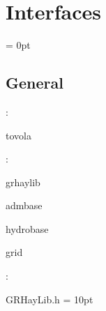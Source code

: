 
\section{Interfaces} 


\parskip = 0pt

\vspace{3mm} \subsection*{General}

: 

tovola
\vspace{2mm}

: 

grhaylib

admbase

hydrobase

grid
\vspace{2mm}

\vspace{5mm}

: 

GRHayLib.h
\vspace{2mm}\parskip = 10pt 

